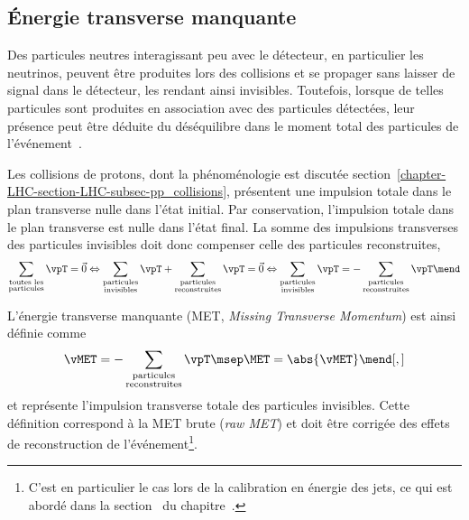 \subsection{Énergie transverse manquante}\label{chapter-LHC-section-evt_reco-subsec-MET}
Des particules neutres interagissant peu avec le détecteur, en particulier les neutrinos, peuvent être produites lors des collisions et se propager sans laisser de signal dans le détecteur, les rendant ainsi invisibles.
Toutefois, lorsque de telles particules sont produites en association avec des particules détectées, leur présence peut être déduite du déséquilibre dans le moment total des particules de l'événement~\cite{CMS-PAS-JME-17-001}.
\par Les collisions de protons, dont la phénoménologie est discutée section~\ref{chapter-LHC-section-LHC-subsec-pp_collisions}, présentent une impulsion totale dans le plan transverse nulle dans l'état initial.
Par conservation, l'impulsion totale dans le plan transverse est nulle dans l'état final.
La somme des impulsions transverses des particules invisibles doit donc compenser celle des particules reconstruites, \ie
\begin{equation}
\sum_{\substack{\text{toutes les}\\\text{particules}}} \vpT = \vec{0}
\Leftrightarrow
\sum_{\substack{\text{particules}\\\text{invisibles}}} \vpT + \sum_{\substack{\text{particules}\\\text{reconstruites}}} \vpT = \vec{0}
\Leftrightarrow
\sum_{\substack{\text{particules}\\\text{invisibles}}} \vpT = -\sum_{\substack{\text{particules}\\\text{reconstruites}}} \vpT \mend
\end{equation}
\par L'énergie transverse manquante (MET, \emph{Missing Transverse Momentum}) est ainsi définie comme
\begin{equation}
\vMET = -\sum_{\substack{\text{particules}\\\text{reconstruites}}} \vpT
\msep
\MET = \abs{\vMET}
\mend[,]
\end{equation}
et représente l'impulsion transverse totale des particules invisibles.
Cette définition correspond à la MET \og brute \fg{} (\emph{raw MET}) et doit être corrigée des effets de reconstruction de l'événement\footnote{C'est en particulier le cas lors de la calibration en énergie des jets, ce qui est abordé dans la section~ du chapitre~.}.
